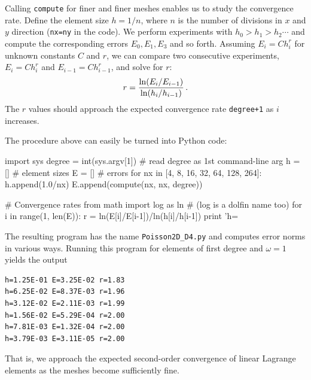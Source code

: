 Calling {\fontsize{10pt}{10pt}\texttt{compute}} for finer and finer meshes enables us to
study the convergence rate. Define the element size
$h=1/n$, where $n$ is the number of divisions in $x$ and $y$ direction
({\fontsize{10pt}{10pt}\texttt{nx=ny}} in the code). We perform experiments with $h_0>h_1>h_2\cdots$
and compute the corresponding errors $E_0, E_1, E_3$ and so forth.
Assuming $E_i=Ch_i^r$ for unknown constants $C$ and $r$, we can compare
two consecutive experiments, $E_i=Ch_i^r$ and $E_{i-1}=Ch_{i-1}^r$,
and solve for $r$:
\[ r = {\ln(E_i/E_{i-1})\over\ln (h_i/h_{i-1})}\thinspace .\]
The $r$ values should approach the expected convergence
rate {\fontsize{10pt}{10pt}\texttt{degree+1}} as $i$ increases.

The procedure above can easily be turned into Python code:
\begin{python}
import sys
degree = int(sys.argv[1])  # read degree as 1st command-line arg
h = []  # element sizes
E = []  # errors
for nx in [4, 8, 16, 32, 64, 128, 264]:
    h.append(1.0/nx)
    E.append(compute(nx, nx, degree))

# Convergence rates
from math import log as ln  # (log is a dolfin name too)
for i in range(1, len(E)):
    r = ln(E[i]/E[i-1])/ln(h[i]/h[i-1])
    print 'h=%
\end{python}
The resulting program has the name {\fontsize{10pt}{10pt}\verb!Poisson2D_D4.py!}
and computes error norms in various ways. Running this
program for elements of first degree and $\omega=1$ yields the output
\begin{Verbatim}[fontsize=\fontsize{10pt}{10pt},tabsize=8,baselinestretch=0.85,
fontfamily=tt,xleftmargin=7mm]
h=1.25E-01 E=3.25E-02 r=1.83
h=6.25E-02 E=8.37E-03 r=1.96
h=3.12E-02 E=2.11E-03 r=1.99
h=1.56E-02 E=5.29E-04 r=2.00
h=7.81E-03 E=1.32E-04 r=2.00
h=3.79E-03 E=3.11E-05 r=2.00
\end{Verbatim}
\noindent
That is, we approach the expected second-order convergence of linear
Lagrange elements as the meshes become sufficiently fine.

